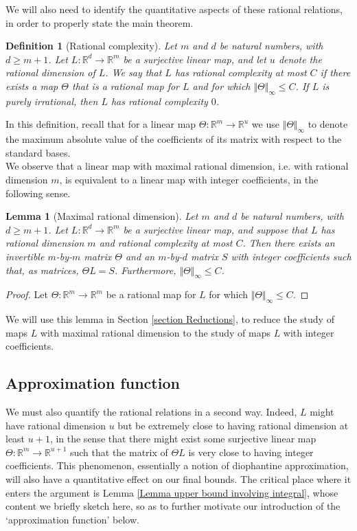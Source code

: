 \documentclass[12pt,a4paper,twoside,reqno]{amsart}
\newtheorem{Lemma}[Theorem]{Lemma}
\newtheorem{Definition}[Theorem]{Definition}
\numberwithin{equation}{section}
\begin{document}
We will also need to identify the quantitative aspects of these rational relations, in order to properly state the main theorem. 

\begin{Definition}[Rational complexity]
Let $m$ and $d$ be natural numbers, with $d\geqslant m+1$. Let $L:\mathbb{R}^d\longrightarrow \mathbb{R}^m$ be a surjective linear map, and let $u$ denote the rational dimension of $L$. We say that $L$ has \emph{rational complexity at most $C$} if there exists a map $\Theta$ that is a rational map for $L$ and for which $\Vert \Theta\Vert_\infty \leqslant C$. If $L$ is purely irrational, then $L$ has rational complexity $0$. 
\end{Definition}
\noindent In this definition, recall that for a linear map $\Theta:\mathbb{R}^m\longrightarrow \mathbb{R}^u$ we use $\Vert \Theta\Vert_\infty$ to denote the maximum absolute value of the coefficients of its matrix with respect to the standard bases.\\


We observe that a linear map with maximal rational dimension, i.e. with rational dimension $m$, is equivalent to a linear map with integer coefficients, in the following sense. 
\begin{Lemma}[Maximal rational dimension]
\label{Lemma full rational dimension}
Let $m$ and $d$ be natural numbers, with $d\geqslant m+1$. Let $L:\mathbb{R}^d\longrightarrow \mathbb{R}^m$ be a surjective linear map, and suppose that $L$ has rational dimension $m$ and rational complexity at most $C$. Then there exists an invertible $m$-by-$m$ matrix $\Theta$ and an $m$-by-$d$ matrix $S$ with integer coefficients such that, as matrices, $\Theta L = S$. Furthermore, $\Vert \Theta\Vert_\infty \leqslant C$. 
\end{Lemma}
\begin{proof}
Let $\Theta:\mathbb{R}^m \longrightarrow \mathbb{R}^m$ be a rational map for $L$ for which $\Vert \Theta \Vert_\infty \leqslant C$.
\end{proof}
\noindent We will use this lemma in Section \ref{section Reductions}, to reduce the study of maps $L$ with maximal rational dimension to the study of maps $L$ with integer coefficients.\\

\subsection{Approximation function}
\label{section approximation function}
We must also quantify the rational relations in a second way. Indeed, $L$ might have rational dimension $u$ but be extremely close to having rational dimension at least $u+1$, in the sense that there might exist some surjective linear map $\Theta:\mathbb{R}^m\longrightarrow \mathbb{R}^{u+1}$ such that the matrix of $\Theta L$ is very close to having integer coefficients. This phenomenon, essentially a notion of diophantine approximation, will also have a quantitative effect on our final bounds. The critical place where it enters the argument is Lemma \ref{Lemma upper bound involving integral}, whose content we briefly sketch here, so as to further motivate our introduction of the `approximation function' below. 
\end{document}
